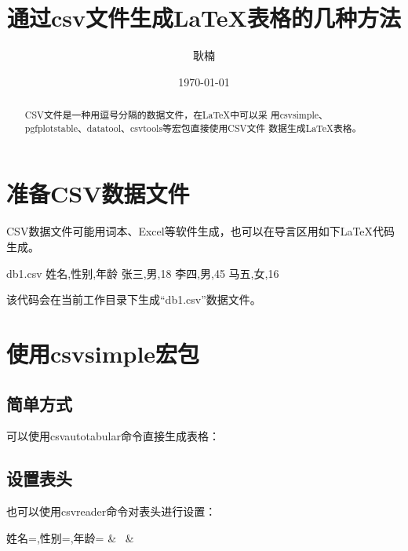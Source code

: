 \documentclass{ctexart}
\title{通过csv文件生成\LaTeX 表格的几种方法}
\author{耿楠}
\date{\today}
\begin{document}
  \maketitle

  \begin{abstract}
    CSV文件是一种用逗号分隔的数据文件，在\LaTeX 中可以采
    用csvsimple、pgfplotstable、datatool、csvtools等宏包直接使用CSV文件
    数据生成\LaTeX 表格。
  \end{abstract}

  \section{准备CSV数据文件}
  CSV数据文件可能用词本、Excel等软件生成，也可以在导言区用如下\LaTeX 代码生成。
  \begin{codeonly}
    \begin{filecontents*}{db1.csv}
      姓名,性别,年龄
      张三,男,18
      李四,男,45
      马五,女,16
    \end{filecontents*}
  \end{codeonly}
  该代码会在当前工作目录下生成``db1.csv''数据文件。

  \section{使用csvsimple宏包}
  \subsection{简单方式}
  可以使用csvautotabular命令直接生成表格：
  \begin{codeonly}
  \end{codeonly}

  \subsection{设置表头}
  也可以使用csvreader命令对表头进行设置：
  \begin{codeonly}
              {姓名=\name,性别=\surname,年龄=\age}%
              {\thecsvrow & \surname~\name & \age}%
  \end{codeonly}
\end{document}
